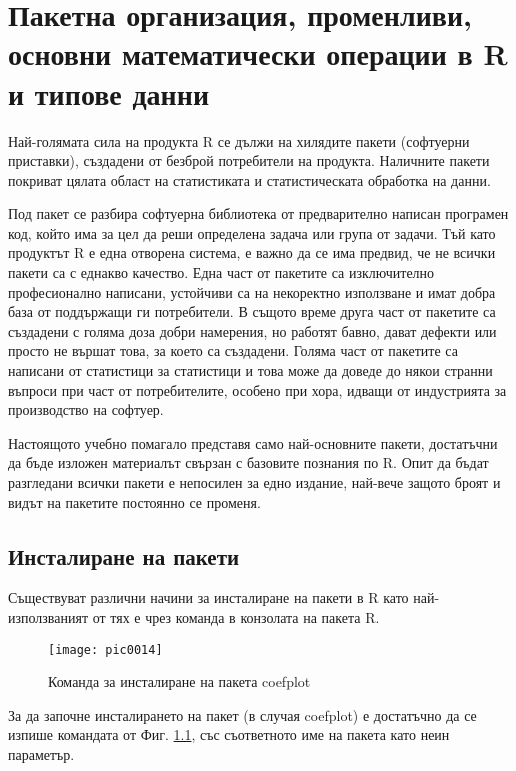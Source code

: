 \newpage
\chapter{Пакетна организация, променливи, основни математически операции в R и типове данни}
\label{chapter02}
\thispagestyle{empty}

Най-голямата сила на продукта R се дължи на хилядите пакети (софтуерни приставки), създадени от безброй потребители на продукта. Наличните пакети покриват цялата област на статистиката и статистическата обработка на данни. 

Под пакет се разбира софтуерна библиотека от предварително написан програмен код, който има за цел да реши определена задача или група от задачи. Тъй като продуктът R е една отворена система, е важно да се има предвид, че не всички пакети са с еднакво качество. Една част от пакетите са изключително професионално написани, устойчиви са на некоректно използване и имат добра база от поддържащи ги потребители. В същото време друга част от пакетите са създадени с голяма доза добри намерения, но работят бавно, дават дефекти или просто не вършат това, за което са създадени. Голяма част от пакетите са написани от статистици за статистици и това може да доведе до някои странни въпроси при част от потребителите, особено при хора, идващи от индустрията за производство на софтуер.

Настоящото учебно помагало представя само най-основните пакети, достатъчни да бъде изложен материалът свързан с базовите познания по R. Опит да бъдат разгледани всички пакети е непосилен за едно издание, най-вече защото броят и видът на пакетите постоянно се променя.

\section{Инсталиране на пакети}

Съществуват различни начини за инсталиране на пакети в R като най-използваният от тях е чрез команда в конзолата на пакета R.

\begin{figure}[h!]
  \centering
  \texttt{[image: pic0014]}
  \caption{Команда за инсталиране на пакета coefplot}
\label{figure0014}
\end{figure}
\FloatBarrier

За да започне инсталирането на пакет (в случая coefplot) е достатъчно да се изпише командата от Фиг. \ref{figure0014}, със съответното име на пакета като неин параметър.

